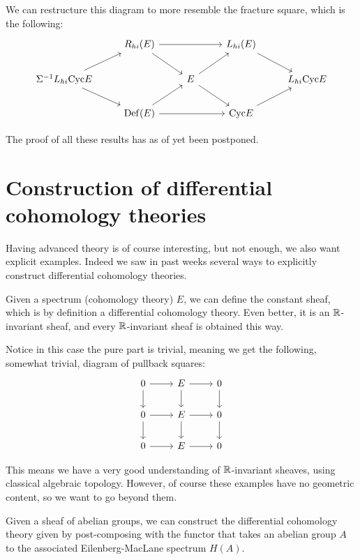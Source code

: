 \documentclass[10pt]{amsart}
\begin{document}
We can restructure this diagram to more resemble the fracture square, which is the following:
\[
\begin{tikzcd}
 & R_{hi}(E) \arrow[dr] \arrow[rr] & & L_{hi}(E) \arrow[dr] & \\
 \Sigma^{-1}L_{hi}\mathrm{Cyc} E \arrow[ur] \arrow[dr ]& & E \arrow[ur] \arrow[dr] & & L_{hi}\mathrm{Cyc} E \\
  & \mathrm{Def}(E) \arrow[ur] \arrow[rr] & & \mathrm{Cyc} E \arrow[ur] & 
\end{tikzcd}
\]

 The proof of all these results has as of yet been postponed.


\section{Construction of differential cohomology theories}
Having advanced theory is of course interesting, but not enough, we also want explicit examples. Indeed we saw in past weeks several ways to explicitly construct differential cohomology theories.

\begin{example}
  Given a spectrum (cohomology theory) $E$, we can define the constant sheaf, which is by definition a differential cohomology theory. Even better, it is an $\mathbb{R}$-invariant sheaf, and every $\mathbb{R}$-invariant sheaf is obtained this way.

  Notice in this case the pure part is trivial, meaning we get the following, somewhat trivial, diagram of pullback squares:
  \[
  \begin{tikzcd}
    0 \arrow[d] \arrow[r] & E \arrow[r] \arrow[d] & 0 \arrow[d] \\ 
     0 \arrow[r] \arrow[d] & E \arrow[r] \arrow[d] & 0 \arrow[d] \\ 
    0 \arrow[r] & E \arrow[r] & 0
  \end{tikzcd}
 \]
\end{example}

This means we have a very good understanding of $\mathbb{R}$-invariant sheaves, using classical algebraic topology. However, of course these examples have no geometric content, so we want to go beyond them.

\begin{example}
  Given a sheaf of abelian groups, we can construct the differential cohomology theory given by post-composing with the functor that takes an abelian group $A$ to the associated Eilenberg-MacLane spectrum $H(A)$. 
\end{example}
\end{document}

